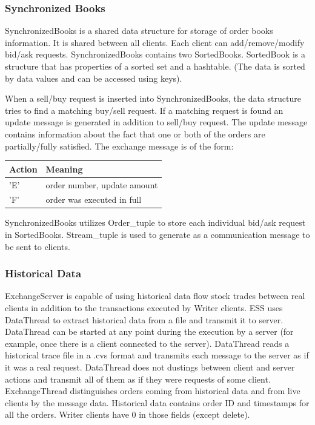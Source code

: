 \documentclass[14pt]{article}
\begin{document}
\subsubsection{Synchronized Books}
SynchronizedBooks is a shared data structure for storage of order books information. It is shared between all clients. Each client can add/remove/modify bid/ask requests. SynchronizedBooks contains two SortedBooks. SortedBook is a structure that has properties of a sorted set and a hashtable. (The data is sorted by data values and can be accessed using keys).

When a sell/buy request is inserted into SynchronizedBooks, the data structure tries to find a matching buy/sell request. If a matching request is found an update message is generated in addition to sell/buy request. The update message contains information about the fact that one or both of the orders are partially/fully satisfied. The exchange message is of the form:


\begin{tabular}{|l|l|}
  \hline
  Action & Meaning \\ \hline
  'E' & order number, update amount \\ \hline
  'F' & order was executed in full \\

  \hline
\end{tabular}


SynchronizedBooks utilizes Order\_tuple to store each individual bid/ask request in SortedBooks. Stream\_tuple is used to generate as a communication message to be sent to clients.


\subsubsection{Historical Data}

ExchangeServer is capable of using historical data flow stock trades between real clients in addition to the transactions executed by Writer clients. ESS uses DataThread to extract historical data from a file and transmit it to server. DataThread can be started at any point during the execution by a server (for example, once there is a client connected to the server). DataThread reads a historical trace file in a .cvs format and transmits each message to the server as if it was a real request. DataThread does not dustings between client and server actions and transmit all of them as if they were requests of some client. ExchangeThread distinguishes orders coming from historical data and from live clients by the message data. Historical data contains order ID and timestamps for all the orders. Writer clients have 0 in those fields (except delete).  
\end{document}
